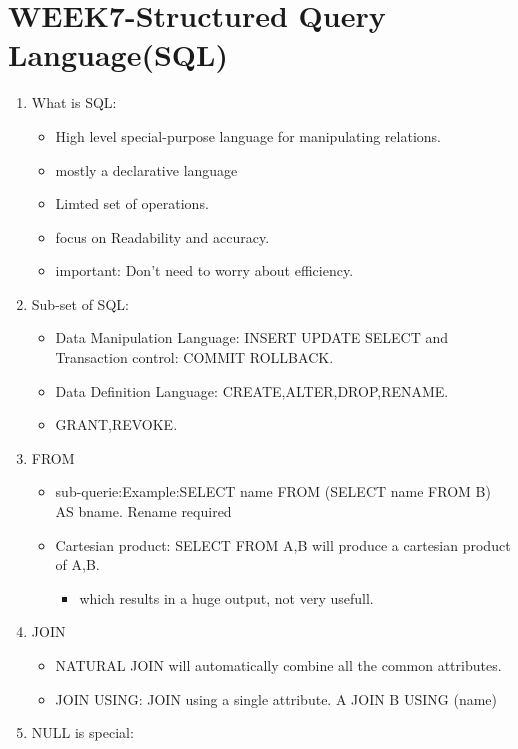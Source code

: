 \pagebreak
\section{WEEK7-Structured Query Language(SQL)}
\begin{enumerate}
    \item What is SQL:\\ 
        \begin{itemize}
            \item High level special-purpose language for manipulating relations.
            \item mostly a declarative language
            \item Limted set of operations.
            \item focus on Readability and accuracy.
            \item important: Don't need to worry about efficiency.
        \end{itemize}
    \item Sub-set of SQL:\begin{itemize}
        \item Data Manipulation Language: INSERT UPDATE SELECT and Transaction control: COMMIT ROLLBACK.
        \item Data Definition Language: CREATE,ALTER,DROP,RENAME.
        \item GRANT,REVOKE.
    \end{itemize}
    \item FROM
    \begin{itemize}
        \item sub-querie:Example:SELECT name FROM (SELECT name FROM B) AS bname. Rename required
        \item Cartesian product: SELECT FROM A,B will produce a cartesian product of A,B.\begin{itemize}
            \item which results in a huge output, not very usefull.
        \end{itemize}
    \end{itemize} 
    \item JOIN
    \begin{itemize}
        \item NATURAL JOIN will automatically combine all the common attributes.
        \item JOIN USING: JOIN using a single attribute. A JOIN B USING (name)
    \end{itemize}
    \item NULL is special: \begin{itemize}

\end{itemize}
\end{enumerate}

